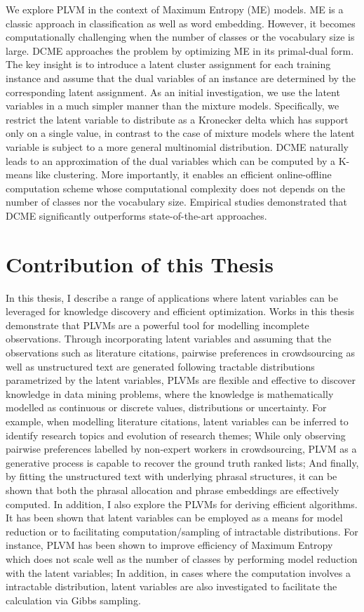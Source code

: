 We explore PLVM in the context of Maximum Entropy (ME) models. ME is a classic
approach in classification as well as word embedding. However, it becomes
computationally challenging when the number of classes or the vocabulary size is
large. DCME approaches the problem by optimizing ME in its primal-dual form. The
key insight is to introduce a latent cluster assignment for each training
instance and assume that the dual variables of an instance are determined by the
corresponding latent assignment. As an initial investigation, we use the latent
variables in a much simpler manner than the mixture models. Specifically, we
restrict the latent variable to distribute as a Kronecker delta which has
support only on a single value, in contrast to the case of mixture models where
the latent variable is subject to a more general multinomial distribution. DCME
naturally leads to an approximation of the dual variables which can be computed
by a K-means like clustering. More importantly, it enables an efficient
online-offline computation scheme whose computational complexity does not
depends on the number of classes nor the vocabulary size. Empirical studies
demonstrated that DCME significantly outperforms state-of-the-art approaches.

\section{Contribution of this Thesis}

In this thesis, I describe a range of applications where latent variables can be
leveraged for knowledge discovery and efficient optimization. Works in this
thesis demonstrate that PLVMs are a powerful tool for modelling incomplete
observations. Through incorporating latent variables and assuming that the
observations such as literature citations, pairwise preferences in crowdsourcing
as well as unstructured text are generated following tractable distributions
parametrized by the latent variables, PLVMs are flexible and effective to
discover knowledge in data mining problems, where the knowledge is
mathematically modelled as continuous or discrete values, distributions or
uncertainty. For example, when modelling literature citations, latent variables
can be inferred to identify research topics and evolution of research themes;
While only observing pairwise preferences labelled by non-expert workers in
crowdsourcing, PLVM as a generative process is capable to recover the ground
truth ranked lists; And finally, by fitting the unstructured text with
underlying phrasal structures, it can be shown that both the phrasal allocation
and phrase embeddings are effectively computed. In addition, I also explore the
PLVMs for deriving efficient algorithms. It has been shown that latent variables
can be employed as a means for model reduction or to facilitating
computation/sampling of intractable distributions. For instance, PLVM has been
shown to improve efficiency of Maximum Entropy which does not scale well as the
number of classes by performing model reduction with the latent variables; In
addition, in cases where the computation involves a intractable distribution,
latent variables are also investigated to facilitate the calculation via Gibbs
sampling.

